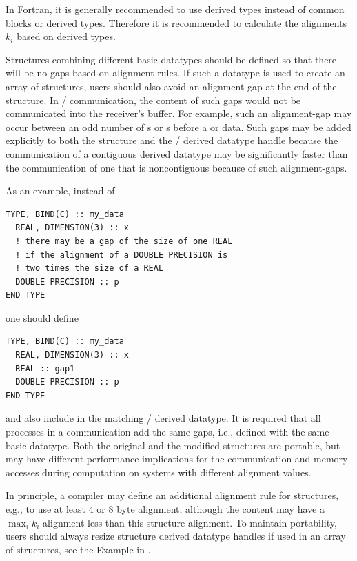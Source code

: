 \begin{implementors}
In Fortran, it is generally recommended to use  derived types instead of
common blocks or  derived types. Therefore it is recommended to calculate the
alignments $k_i$ based on  derived types.
\end{implementors}

\begin{users}
Structures combining different basic datatypes should be defined so that there will
be no gaps based on alignment rules.  If such a datatype is used to create an array of structures, users
should also avoid an alignment-gap at the end of the structure.
In \MPI/ communication, the content of such gaps would not be communicated
into the receiver's buffer.
For example, such an alignment-gap may occur between an odd number of
s or s before a  or
 data.  Such gaps
may be added explicitly to both the structure and the \MPI/ derived
datatype handle because the communication of a contiguous derived
datatype may be significantly faster than the communication of one
that is noncontiguous because of such alignment-gaps.

As an example, instead of

\begin{lstlisting}[language={[MPI08]Fortran}]
TYPE, BIND(C) :: my_data
  REAL, DIMENSION(3) :: x
  ! there may be a gap of the size of one REAL
  ! if the alignment of a DOUBLE PRECISION is
  ! two times the size of a REAL
  DOUBLE PRECISION :: p
END TYPE
\end{lstlisting}

one should define

\begin{lstlisting}[language={[MPI08]Fortran}]
TYPE, BIND(C) :: my_data
  REAL, DIMENSION(3) :: x
  REAL :: gap1
  DOUBLE PRECISION :: p
END TYPE
\end{lstlisting}

and also include  in the matching \MPI/ derived datatype.
It is required that all processes in a communication add the same
gaps, i.e., defined with the same basic datatype.
Both the original and the modified structures are portable,
but may have different performance implications for the
communication and memory accesses during computation on
systems with different alignment values.

In principle, a compiler may define an additional alignment rule
for structures, e.g., to use at least 4 or 8 byte alignment, although
the content may have a $\max_i k_i$ alignment less than this structure
alignment. To maintain portability, users should
always resize structure derived datatype handles
if used in an array of structures, see the Example in
.
\end{users}

